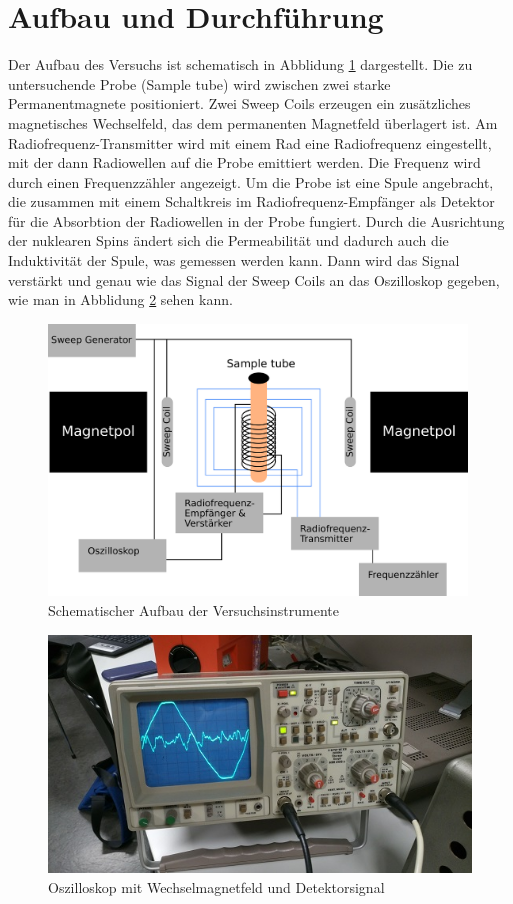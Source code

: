 \section{Aufbau und Durchführung}
Der Aufbau des Versuchs ist schematisch in Abblidung \ref{aufbau} dargestellt. Die zu untersuchende Probe (Sample tube) wird zwischen zwei starke Permanentmagnete positioniert. Zwei Sweep Coils erzeugen ein zusätzliches magnetisches Wechselfeld, das dem permanenten Magnetfeld überlagert ist. Am Radiofrequenz-Transmitter wird mit einem Rad eine Radiofrequenz eingestellt, mit der dann Radiowellen auf die Probe emittiert werden. Die Frequenz wird durch einen Frequenzzähler angezeigt. Um die Probe ist eine Spule angebracht, die zusammen mit einem Schaltkreis im Radiofrequenz-Empfänger als Detektor für die Absorbtion der Radiowellen in der Probe fungiert. Durch die Ausrichtung der nuklearen Spins ändert sich die Permeabilität und dadurch auch die Induktivität der Spule, was gemessen werden kann. Dann wird das Signal verstärkt und genau wie das Signal der Sweep Coils an das Oszilloskop gegeben, wie man in Abblidung \ref{oszi} sehen kann.
\begin{figure}[htbp] 
     \includegraphics[width=0.99\textwidth]{Aufbau.png}
  \caption{Schematischer Aufbau der Versuchsinstrumente}
  \label{aufbau}
\end{figure}

\begin{figure}[htbp] 
     \includegraphics[scale=0.5]{Oszi.jpg}
  \caption{Oszilloskop mit Wechselmagnetfeld und Detektorsignal}
  \label{oszi}
\end{figure}

